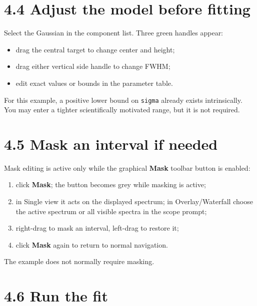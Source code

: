 \documentclass[
  10pt,
  a4paper,
  oneside]{scrreprt}
\providecommand{\tightlist}{%
  \setlength{\itemsep}{0pt}\setlength{\parskip}{0pt}}
\begin{document}
\hypertarget{adjust-the-model-before-fitting}{%
\section{4.4 Adjust the model before
fitting}\label{adjust-the-model-before-fitting}}

Select the Gaussian in the component list. Three green handles appear:

\begin{itemize}
\tightlist
\item
  drag the central target to change center and height;
\item
  drag either vertical side handle to change FWHM;
\item
  edit exact values or bounds in the parameter table.
\end{itemize}

For this example, a positive lower bound on \texttt{sigma} already
exists intrinsically. You may enter a tighter scientifically motivated
range, but it is not required.

\hypertarget{mask-an-interval-if-needed}{%
\section{4.5 Mask an interval if
needed}\label{mask-an-interval-if-needed}}

Mask editing is active only while the graphical \textbf{Mask} toolbar
button is enabled:

\begin{enumerate}
\def\labelenumi{\arabic{enumi}.}
\tightlist
\item
  click \textbf{Mask}; the button becomes grey while masking is active;
\item
  in Single view it acts on the displayed spectrum; in Overlay/Waterfall
  choose the active spectrum or all visible spectra in the scope prompt;
\item
  right-drag to mask an interval, left-drag to restore it;
\item
  click \textbf{Mask} again to return to normal navigation.
\end{enumerate}

The example does not normally require masking.

\hypertarget{run-the-fit}{%
\section{4.6 Run the fit}\label{run-the-fit}}
\end{document}
